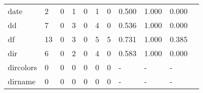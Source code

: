 \begin{longtable}{lp{1.2cm}p{1.2cm}p{1.2cm}p{1.2cm}p{1.2cm}p{1.2cm}p{1.2cm}p{1.2cm}p{1.2cm}p{1.2cm}}
date      &                                     2 &                                                  0 &                                                  1 &                                                  0 &                                                  1 &                                                  0 &                                              0.500 &                                              1.000 &                                              0.000 \\
dd        &                                     7 &                                                  0 &                                                  3 &                                                  0 &                                                  4 &                                                  0 &                                              0.536 &                                              1.000 &                                              0.000 \\
df        &                                    13 &                                                  0 &                                                  3 &                                                  0 &                                                  5 &                                                  5 &                                              0.731 &                                              1.000 &                                              0.385 \\
dir       &                                     6 &                                                  0 &                                                  2 &                                                  0 &                                                  4 &                                                  0 &                                              0.583 &                                              1.000 &                                              0.000 \\
dircolors &                                     0 &                                                  0 &                                                  0 &                                                  0 &                                                  0 &                                                  0 &                                                  - &                                                  - &                                                  - \\
dirname   &                                     0 &                                                  0 &                                                  0 &                                                  0 &                                                  0 &                                                  0 &                                                  - &                                                  - &                                                  - \\

\end{longtable}
